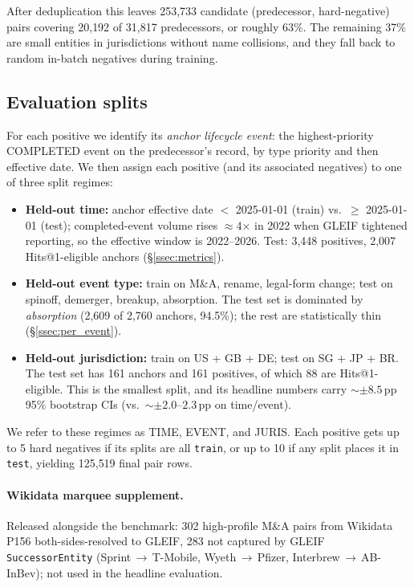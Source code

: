 \documentclass[sigconf]{acmart}
\begin{document}
After deduplication this leaves 253{,}733 candidate
(predecessor, hard-negative) pairs covering 20{,}192 of 31{,}817
predecessors, or roughly 63\%. The remaining 37\% are small
entities in jurisdictions without name collisions, and they fall
back to random in-batch negatives during training.

\subsection{Evaluation splits}
\label{ssec:splits}

For each positive we identify its \emph{anchor lifecycle event}: the
highest-priority COMPLETED event on the predecessor's record, by
type priority and then effective date. We then assign each positive (and its
associated negatives) to one of three split regimes:

\begin{itemize}
  \item \textbf{Held-out time:} anchor effective date $<$ 2025-01-01
        (train) vs.\ $\geq$ 2025-01-01 (test); completed-event
        volume rises $\approx$4$\times$ in 2022 when GLEIF tightened
        reporting, so the effective window is 2022--2026. Test:
        3{,}448 positives, 2{,}007 Hits@1-eligible anchors
        (\S\ref{ssec:metrics}).
  \item \textbf{Held-out event type:} train on M\&A,
        rename, legal-form change; test on spinoff, demerger,
        breakup, absorption. The test set is dominated by
        \emph{absorption} (2{,}609 of 2{,}760 anchors, 94.5\%); the
        rest are statistically thin (\S\ref{ssec:per_event}).
  \item \textbf{Held-out jurisdiction:} train on US + GB + DE; test on
        SG + JP + BR. The test set has 161 anchors and 161
        positives, of which 88 are Hits@1-eligible. This is the
        smallest split, and its headline numbers carry
        ${\sim}{\pm}8.5$\,pp 95\% bootstrap CIs (vs.\
        ${\sim}{\pm}2.0$--$2.3$\,pp on time/event).
\end{itemize}

We refer to these regimes as TIME, EVENT, and JURIS.
Each positive gets up to 5 hard negatives if its splits are all
\texttt{train}, or up to 10 if any split places it in \texttt{test}, yielding
125{,}519 final pair rows.


\paragraph{Wikidata marquee supplement.} Released alongside the
benchmark: 302 high-profile M\&A pairs from Wikidata P156
both-sides-resolved to GLEIF, 283 not captured by GLEIF
\texttt{SuccessorEntity} (Sprint\,$\to$\,T-Mobile,
Wyeth\,$\to$\,Pfizer, Interbrew\,$\to$\,AB-InBev); not used in the
headline evaluation.
\end{document}
